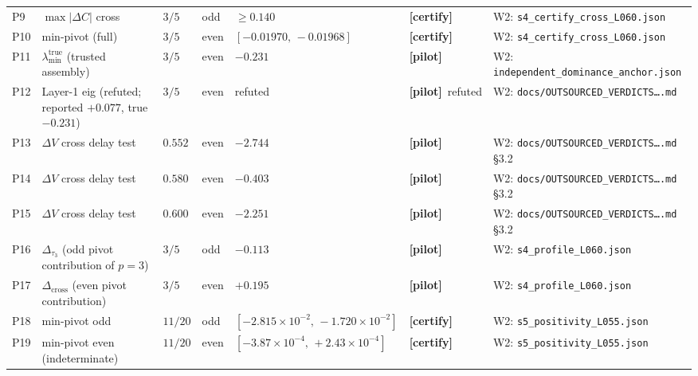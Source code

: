 \documentclass[12pt,a4paper]{amsart}
\theoremstyle{plain}
\theoremstyle{definition}
\newcommand{\ltrue}{\lambda_{\min}^{\mathrm{true}}}
\newcommand{\certify}{\textbf{[certify]}}
\newcommand{\pilot}{\textbf{[pilot]}}
\begin{document}
\begin{table}
\begin{tabular}{@{}lp{.22\textheight}lllp{.18\textheight}l@{}}
P9  & $\max|\Delta C|$ cross                                & $3/5$         & odd  & $\ge 0.140$                                 & \certify            & W2: \texttt{s4\_certify\_cross\_L060.json} \\
P10 & min-pivot (full)                                      & $3/5$         & even & $[-0.01970,\,-0.01968]$                     & \certify            & W2: \texttt{s4\_certify\_cross\_L060.json} \\
P11 & $\ltrue$ (trusted assembly)                           & $3/5$         & even & $-0.231$                                    & \pilot              & W2: \texttt{independent\_dominance\_anchor.json} \\
P12 & Layer-1 eig (refuted; reported $+0.077$, true $-0.231$) & $3/5$      & even & refuted                                     & \pilot\ refuted     & W2: \texttt{docs/OUTSOURCED\_VERDICTS\ldots.md} \\
P13 & $\Delta V$ cross delay test                           & $0.552$       & even & $-2.744$                                    & \pilot              & W2: \texttt{docs/OUTSOURCED\_VERDICTS\ldots.md} §3.2 \\
P14 & $\Delta V$ cross delay test                           & $0.580$       & even & $-0.403$                                    & \pilot              & W2: \texttt{docs/OUTSOURCED\_VERDICTS\ldots.md} §3.2 \\
P15 & $\Delta V$ cross delay test                           & $0.600$       & even & $-2.251$                                    & \pilot              & W2: \texttt{docs/OUTSOURCED\_VERDICTS\ldots.md} §3.2 \\
P16 & $\Delta_{\tau_3}$ (odd pivot contribution of $p{=}3$) & $3/5$         & odd  & $-0.113$                                    & \pilot              & W2: \texttt{s4\_profile\_L060.json} \\
P17 & $\Delta_{\mathrm{cross}}$ (even pivot contribution)   & $3/5$         & even & $+0.195$                                    & \pilot              & W2: \texttt{s4\_profile\_L060.json} \\
P18 & min-pivot odd                                         & $11/20$       & odd  & $[-2.815\times10^{-2},\,-1.720\times10^{-2}]$ & \certify          & W2: \texttt{s5\_positivity\_L055.json} \\
P19 & min-pivot even (indeterminate)                        & $11/20$       & even & $[-3.87\times10^{-4},\,+2.43\times10^{-4}]$& \certify            & W2: \texttt{s5\_positivity\_L055.json} \\

\end{tabular}
\end{table}
\end{document}
